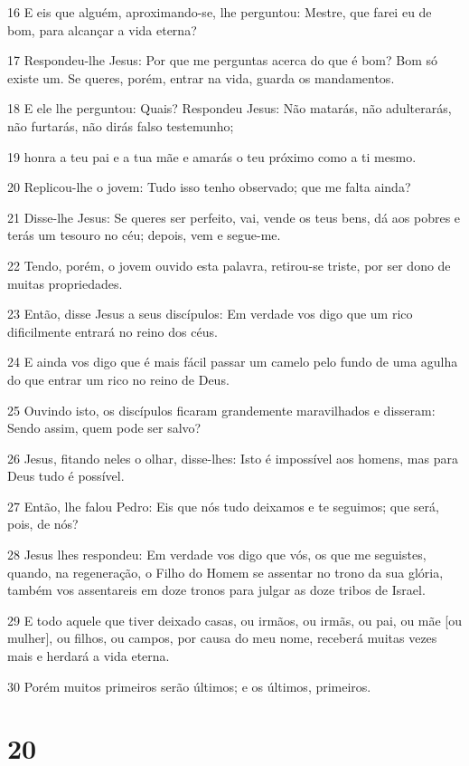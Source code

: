 \par 16 E eis que alguém, aproximando-se, lhe perguntou: Mestre, que farei eu de bom, para alcançar a vida eterna?
\par 17 Respondeu-lhe Jesus: Por que me perguntas acerca do que é bom? Bom só existe um. Se queres, porém, entrar na vida, guarda os mandamentos.
\par 18 E ele lhe perguntou: Quais? Respondeu Jesus: Não matarás, não adulterarás, não furtarás, não dirás falso testemunho;
\par 19 honra a teu pai e a tua mãe e amarás o teu próximo como a ti mesmo.
\par 20 Replicou-lhe o jovem: Tudo isso tenho observado; que me falta ainda?
\par 21 Disse-lhe Jesus: Se queres ser perfeito, vai, vende os teus bens, dá aos pobres e terás um tesouro no céu; depois, vem e segue-me.
\par 22 Tendo, porém, o jovem ouvido esta palavra, retirou-se triste, por ser dono de muitas propriedades.
\par 23 Então, disse Jesus a seus discípulos: Em verdade vos digo que um rico dificilmente entrará no reino dos céus.
\par 24 E ainda vos digo que é mais fácil passar um camelo pelo fundo de uma agulha do que entrar um rico no reino de Deus.
\par 25 Ouvindo isto, os discípulos ficaram grandemente maravilhados e disseram: Sendo assim, quem pode ser salvo?
\par 26 Jesus, fitando neles o olhar, disse-lhes: Isto é impossível aos homens, mas para Deus tudo é possível.
\par 27 Então, lhe falou Pedro: Eis que nós tudo deixamos e te seguimos; que será, pois, de nós?
\par 28 Jesus lhes respondeu: Em verdade vos digo que vós, os que me seguistes, quando, na regeneração, o Filho do Homem se assentar no trono da sua glória, também vos assentareis em doze tronos para julgar as doze tribos de Israel.
\par 29 E todo aquele que tiver deixado casas, ou irmãos, ou irmãs, ou pai, ou mãe [ou mulher], ou filhos, ou campos, por causa do meu nome, receberá muitas vezes mais e herdará a vida eterna.
\par 30 Porém muitos primeiros serão últimos; e os últimos, primeiros.

\chapter{20}


